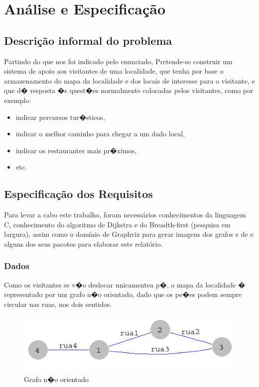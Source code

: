 \documentclass[11pt,a4paper]{article}
\newenvironment{mtc}{\secttoc\sectlof}{\pagebreak}
\begin{document}
\section{An\'alise e Especifica\c c\~ao}
\begin{mtc}
\subsection{Descri\c c\~ao informal do problema}
Partindo do que nos foi indicado pelo enunciado, Pretende-se construir um sistema de apoio aos visitantes de uma localidade, que tenha por
base o armazenamento do mapa da localidade e dos locais de interesse para o visitante,
e que d� resposta �s quest�es normalmente colocadas pelos visitantes, como por exemplo:
\begin{itemize}
 \item indicar percursos tur�sticos,
 \item indicar o melhor caminho para chegar a um dado local,
 \item indicar os restaurantes mais pr�ximos,
 \item etc.
\end{itemize}

\subsection{Especifica\c c\~ao dos Requisitos}
Para levar a cabo este trabalho, foram necess\'arios conhecimentos da linguagem \textsf{C}, conhecimento do algoritmo de
\textsf{Dijkstra} e do \textsf{Breadth-first} (pesquisa em largura), assim como o dom\'inio de \textsf{Graphviz} para gerar imagens dos 
grafos e de {\LaTeXe} e alguns dos seus pacotes para elaborar este relat\'orio.
\\
\subsubsection{Dados}
Como os visitantes se v�o deslocar unicamentea p�, o mapa da localidade � representado por um grafo n�o orientado, dado que os pe�es 
podem sempre circular nas ruas, nos dois sentidos.\\

\begin{figure}[!htb]\label{grafo_nao_orientado}
    \centering
        \includegraphics[width=.5\textwidth]{stuff/grafo_nao_orientado.png}
    \caption{Grafo n�o orientado}
\end{figure}


\end{mtc}
\end{document}
